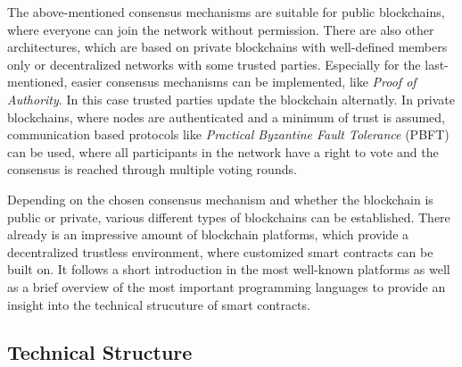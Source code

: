 \documentclass[conference]{IEEEtran}
\begin{document}
The above-mentioned consensus mechanisms are suitable for public blockchains, where everyone can join the network without permission. There are also other architectures, which are based on private blockchains with well-defined members only or decentralized networks with some trusted parties. Especially for the last-mentioned, easier consensus mechanisms can be implemented, like \textit{Proof of Authority}. In this case trusted parties update the blockchain alternatly. In private blockchains, where nodes are authenticated and a minimum of trust is assumed, communication based protocols like \textit{Practical Byzantine Fault Tolerance} (PBFT) can be used, where all participants in the network have a right to vote and the consensus is reached through multiple voting rounds. \cite{Dinh?} \par 
Depending on the chosen consensus mechanism and whether the blockchain is public or private, various different types of blockchains can be established. There already is an impressive amount of blockchain platforms, which provide a decentralized trustless environment, where customized smart contracts can be built on. It follows a short introduction in the most well-known platforms as well as a brief overview of the most important programming languages to provide an insight into the technical strucuture of smart contracts. 
\subsection{Technical Structure}
\end{document}
